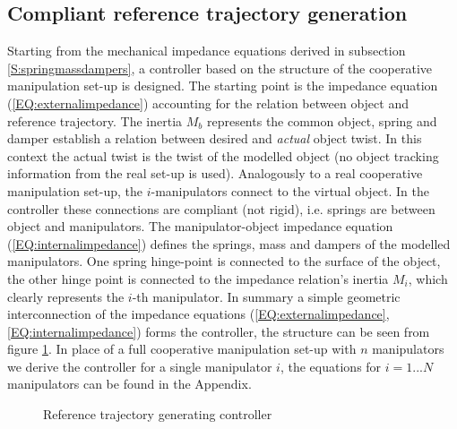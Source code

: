 \documentclass[a4paper,twoside, openright,12pt]{report}
\begin{document}
\subsection{Compliant reference trajectory generation}
Starting from the mechanical impedance equations derived in subsection \ref{S:springmassdampers}, a controller based on the structure of the cooperative manipulation set-up is designed. The starting point is the impedance equation (\ref{EQ:externalimpedance}) accounting for the relation between object and reference trajectory. The inertia $M_b$ represents the common object, spring and damper establish a relation between desired and \emph{actual} object twist. In this context the actual twist is the twist of the modelled object (no object tracking information from the real set-up is used). Analogously to a real cooperative manipulation set-up, the $i$-manipulators connect to the virtual object. In the controller these connections are compliant (not rigid), i.e. springs are between object and manipulators. The manipulator-object impedance equation (\ref{EQ:internalimpedance}) defines the springs, mass and dampers of the modelled manipulators. One spring hinge-point is connected to the surface of the object, the other hinge point is connected to the impedance relation's inertia  $M_i$, which clearly represents the $i$-th manipulator. In summary a simple geometric interconnection of the impedance equations (\ref{EQ:externalimpedance},\ref{EQ:internalimpedance}) forms the controller, the structure can be seen from figure \ref{FIG:referencetrajectory}. In place of a full cooperative manipulation set-up with $n$ manipulators we derive the controller for a single manipulator $i$, the equations for $i=1...N$ manipulators can be found in the Appendix.
\begin{figure}[b!]
	\centering
	\sf\small
	\def\svgwidth{0.8\columnwidth}
	
	\caption{Reference trajectory generating controller}
	\label{FIG:referencetrajectory}
\end{figure}
\end{document}
